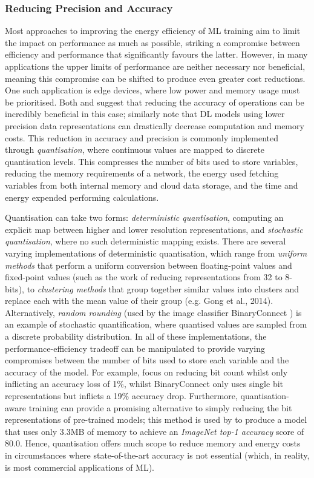 \documentclass[a4paper, 12pt]{article}
\begin{document}
    \subsubsection{Reducing Precision and Accuracy}

    Most approaches to improving the energy efficiency of ML training aim to limit the impact on performance as much as possible, striking a compromise between efficiency and performance that significantly favours the latter. However, in many applications the upper limits of performance are neither necessary nor beneficial, meaning this compromise can be shifted to produce even greater cost reductions. One such application is edge devices, where low power and memory usage must be prioritised. Both  and  suggest that reducing the accuracy of operations can be incredibly beneficial in this case;  similarly note that DL models using lower precision data representations can drastically decrease computation and memory costs. This reduction in accuracy and precision is commonly implemented through \emph{quantisation}, where continuous values are mapped to discrete quantisation levels. This compresses the number of bits used to store variables, reducing the memory requirements of a network, the energy used fetching variables from both internal memory and cloud data storage, and the time and energy expended performing calculations. 

    Quantisation can take two forms: \emph{deterministic quantisation}, computing an explicit map between higher and lower resolution representations, and \emph{stochastic quantisation}, where no such deterministic mapping exists. There are several varying implementations of deterministic quantisation, which range from \emph{uniform methods} that perform a uniform conversion between floating-point values and fixed-point values (such as the work of  reducing representations from 32 to 8-bits), to \emph{clustering methods} that group together similar values into clusters and replace each with the mean value of their group (e.g. Gong et al., 2014). Alternatively, \emph{random rounding} (used by the image classifier BinaryConnect \cite{courbariaux-2015}) is an example of stochastic quantification, where quantised values are sampled from a discrete probability distribution. In all of these implementations, the performance-efficiency tradeoff can be manipulated to provide varying compromises between the number of bits used to store each variable and the accuracy of the model. For example,  focus on reducing bit count whilst only inflicting an accuracy loss of 1\%, whilst BinaryConnect only uses single bit representations but inflicts a 19\% accuracy drop. Furthermore, quantisation-aware training can provide a promising alternative to simply reducing the bit representations of pre-trained models; this method is used by  to produce a model that uses only 3.3MB of memory to achieve an \emph{ImageNet top-1 accuracy} score of 80.0. Hence, quantisation offers much scope to reduce memory and energy costs in circumstances where state-of-the-art accuracy is not essential (which, in reality, is most commercial applications of ML).
\end{document}
